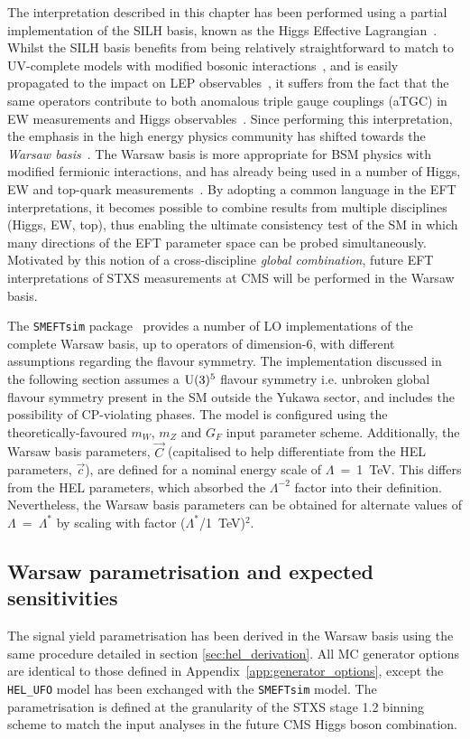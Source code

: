 The interpretation described in this chapter has been performed using a partial implementation of the SILH basis, known as the Higgs Effective Lagrangian~\cite{}. Whilst the SILH basis benefits from being relatively straightforward to match to UV-complete models with modified bosonic interactions~\cite{}, and is easily propagated to the impact on LEP observables~\cite{}, it suffers from the fact that the same operators contribute to both anomalous triple gauge couplings (aTGC) in EW measurements and Higgs observables~\cite{}. Since performing this interpretation, the emphasis in the high energy physics community has shifted towards the \textit{Warsaw basis}~\cite{Grzadkowski:2010es}. The Warsaw basis is more appropriate for BSM physics with modified fermionic interactions, and has already being used in a number of Higgs, EW and top-quark measurements~\cite{}. By adopting a common language in the EFT interpretations, it becomes possible to combine results from multiple disciplines (Higgs, EW, top), thus enabling the ultimate consistency test of the SM in which many directions of the EFT parameter space can be probed simultaneously. Motivated by this notion of a cross-discipline \textit{global combination}, future EFT interpretations of STXS measurements at CMS will be performed in the Warsaw basis.

The \texttt{SMEFTsim} package~\cite{Brivio:2017btx} provides a number of LO implementations of the complete Warsaw basis, up to operators of dimension-6, with different assumptions regarding the flavour symmetry. The implementation discussed in the following section assumes a ${\rm{U}}(3)^5$ flavour symmetry i.e. unbroken global flavour symmetry present in the SM outside the Yukawa sector, and includes the possibility of CP-violating phases. The model is configured using the theoretically-favoured $m_W$, $m_Z$ and $G_F$ input parameter scheme. Additionally, the Warsaw basis parameters, $\vec{C}$ (capitalised to help differentiate from the HEL parameters, $\vec{c}$), are defined for a nominal energy scale of $\Lambda$~=~1~TeV. This differs from the HEL parameters, which absorbed the $\Lambda^{-2}$ factor into their definition. Nevertheless, the Warsaw basis parameters can be obtained for alternate values of $\Lambda$~=~$\Lambda^*$ by scaling with factor ($\Lambda^*$/1~TeV)$^2$.

\subsection{Warsaw parametrisation and expected sensitivities}
The signal yield parametrisation has been derived in the Warsaw basis using the same procedure detailed in section \ref{sec:hel_derivation}. All MC generator options are identical to those defined in Appendix~\ref{app:generator_options}, except the \texttt{HEL\_UFO} model has been exchanged with the \texttt{SMEFTsim} model. The parametrisation is defined at the granularity of the STXS stage 1.2 binning scheme to match the input analyses in the future CMS Higgs boson combination. 

